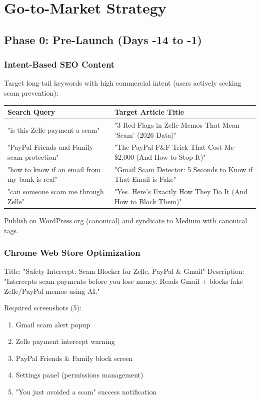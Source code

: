 \documentclass[12pt]{article}
\begin{document}
\newpage
\section{Go-to-Market Strategy}

\subsection{Phase 0: Pre-Launch (Days -14 to -1)}

\subsubsection{Intent-Based SEO Content}
Target long-tail keywords with high commercial intent (users actively seeking scam prevention):

\begin{longtable}{|p{}|p{}|}
\hline
\textbf{Search Query} & \textbf{Target Article Title} \\
\hline
"is this Zelle payment a scam" & "3 Red Flags in Zelle Memos That Mean 'Scam' (2026 Data)" \\
\hline
"PayPal Friends and Family scam protection" & "The PayPal F\&F Trick That Cost Me \$2,000 (And How to Stop It)" \\
\hline
"how to know if an email from my bank is real" & "Gmail Scam Detector: 5 Seconds to Know if That Email is Fake" \\
\hline
"can someone scam me through Zelle" & "Yes. Here's Exactly How They Do It (And How to Block Them)" \\
\hline
\end{longtable}

Publish on WordPress.org (canonical) and syndicate to Medium with canonical tags.

\subsubsection{Chrome Web Store Optimization}
Title: "Safety Intercept: Scam Blocker for Zelle, PayPal \& Gmail"
Description: "Intercepts scam payments before you lose money. Reads Gmail + blocks fake Zelle/PayPal memos using AI."

Required screenshots (5):
\begin{enumerate}
    \item Gmail scam alert popup
    \item Zelle payment intercept warning
    \item PayPal Friends \& Family block screen
    \item Settings panel (permissions management)
    \item "You just avoided a scam" success notification
\end{enumerate}
\end{document}
